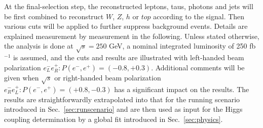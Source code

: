 
At the final-selection step, the reconstructed leptons, taus, photons and jets 
will be first combined to reconstruct $W$, $Z$, $h$ or $top$ according to the signal. 
Then various cuts will be applied to further suppress background events.
Details are explained measurement by measurement in the following. 
Unless stated otherwise, the analysis is done at $\sqrt{s}=250$ GeV,
a nominal integrated luminosity of 250 fb$^{-1}$ is assumed, and
the cuts and results are illustrated with left-handed beam polarization
$e^-_Le^+_R: P(e^-,e^+)=(-0.8,+0.3)$. Additional comments will be given
when $\sqrt{s}$ or right-handed beam polarization 
$e^-_Re^+_L: P(e^-,e^+)=(+0.8,-0.3)$ has a significant impact on the results.
The results are straightforwardly extrapolated into that for the running scenario
introduced in Sec.~\ref{sec:runscenario} and are then used as input for the 
Higgs coupling determination by a global fit introduced in Sec.~\ref{sec:physics}.
